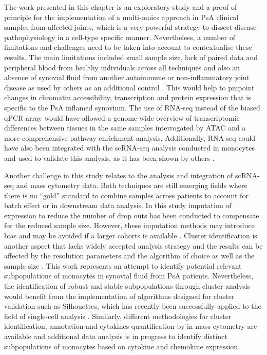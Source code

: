 The work presented in this chapter is an exploratory study and a proof of principle for the implementation of a multi-omics approach in PsA clinical samples from affected joints, which is a very powerful strategy to dissect disease pathophysiology in a cell-type specific manner. Nevertheless, a number of limitations and challenges need to be taken into account to contextualise these results. The main limitations included small sample size, lack of paired data and peripheral blood from healthy individuals across all techniques and also an absence of synovial fluid from another autoimmune or non-inflammatory joint disease as used by others as an additional control \parencite{Fumitaka2018, Dolcino2015,Zhang2018}. This would help to pinpoint changes in chromatin accessibility, transcription and protein expression that is specific to the PsA inflamed synovium. The use of RNA-seq instead of the biased qPCR array would have allowed a genome-wide overview of transcriptomic differences between tissues in the same samples interrogated by ATAC and a more comprehensive pathway enrichment analysis. Additionally, RNA-seq could have also been integrated with the scRNA-seq analysis conducted in monocytes and used to validate this analysis, as it has been shown by others \parencite{Zhang2018}. 


Another challenge in this study relates to the analysis and integration of scRNA-seq and mass cytometry data. Both techniques are still emerging fields where there is no ``gold'' standard to combine samples across patients to account for batch effect or in downstream data analysis. In this study imputation of expression to reduce the number of drop outs has been conducted to compensate for the reduced sample size. However, these imputation methods may introduce bias and may be avoided if a larger cohorts is available \parencite{Andrews2018}. Cluster identification is another aspect that lacks widely accepted analysis strategy and the results can be affected by the resolution parameters and the algorithm of choice as well as the sample size \parencite{Kiselev2019}. This work represents an attempt to identify potential relevant subpopulations of monocytes in synovial fluid from PsA patients. Nevertheless, the identification of robust and stable subpopulations through cluster analysis would benefit from the implementation of algorithms designed for cluster validation such as Silhouettes, which has recently been successfully applied to the field of single-cell analysis \parencite{Rousseeuw1987,Zhang2018}. Similarly, different methodologies for cluster identification, annotation and cytokines quantification by in mass cytometry are available and additional data analysis is in progress to identify distinct subpopulations of monocytes based on cytokine and chemokine expression. %

